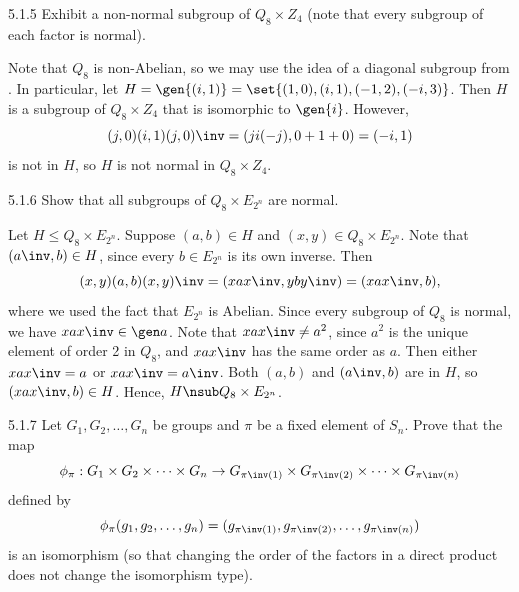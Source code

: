 \begin{exercise}{5.1.5}
    Exhibit a non-normal subgroup of $Q_8 \times Z_4$ (note that every subgroup of each factor is normal).
\end{exercise}

\begin{sol}
    Note that $Q_8$ is non-Abelian, so we may use the idea of a diagonal subgroup from .
	In particular, let $H = \gen{(i, 1)} = \set{(1, 0), (i, 1), (-1, 2), (-i, 3)}$.
	Then $H$ is a subgroup of $Q_8 \times Z_4$ that is isomorphic to $\gen{i}$.
	However,
    \[
    	(j, 0)(i, 1)(j, 0)\inv = (ji(-j), 0 + 1 + 0) = (-i, 1)
    \]
    is not in $H$, so $H$ is not normal in $Q_8 \times Z_4$.
\end{sol}

\begin{exercise}{5.1.6}
    Show that all subgroups of $Q_8 \times E_{2^n}$ are normal.
\end{exercise}

\begin{sol}
    Let $H \leq Q_8 \times E_{2^n}$.
	Suppose $(a, b) \in H$ and $(x, y) \in Q_8 \times E_{2^n}$.
	Note that $(a\inv, b) \in H$, since every $b \in E_{2^n}$ is its own inverse.
	Then
    \[
    	(x, y)(a, b)(x, y)\inv = (xax\inv, yby\inv) = (xax\inv, b),
    \]
    where we used the fact that $E_{2^n}$ is Abelian.
	Since every subgroup of $Q_8$ is normal, we have $xax\inv \in \gen a$.
    Note that $xax\inv \neq a^2$, since $a^2$ is the unique element of order 2 in $Q_8$, and $xax\inv$ has the same order as $a$.
    Then either $xax\inv = a$ or $xax\inv = a\inv$.
    Both $(a, b)$ and $(a\inv, b)$ are in $H$, so $(xax\inv, b) \in H$.
    Hence, $H \nsub Q_8 \times E_{2^n}$.
\end{sol}

\begin{exercise}{5.1.7}
    Let $G_1, G_2, \ldots, G_n$ be groups and $\pi$ be a fixed element of $S_n$.
	Prove that the map 
    \[
    	\phi_\pi : G_1 \times G_2 \times \cdots \times G_n \to G_{\pi\inv(1)} \times G_{\pi\inv(2)} \times \cdots \times G_{\pi\inv(n)}
    \]
    defined by
    \[
    	\phi_\pi(g_1, g_2, \ldots, g_n) = (g_{\pi\inv(1)}, g_{\pi\inv(2)}, \ldots, g_{\pi\inv(n)})
    \]
    is an isomorphism (so that changing the order of the factors in a direct product does not change the isomorphism type).
\end{exercise}

